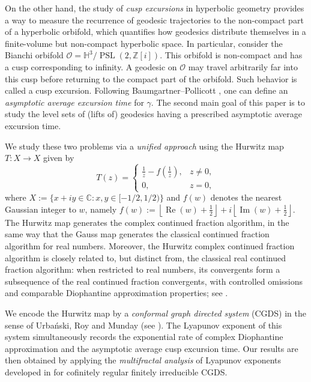 \documentclass[11pt]{amsart}
\theoremstyle{plain}
\theoremstyle{definition}
\renewcommand\~{\tilde}%
\numberwithin{equation}{section}
\begin{document}
On the other hand, the study of {\it cusp excursions} in hyperbolic geometry
provides a way to measure the recurrence of geodesic trajectories to the non-compact part of a hyperbolic orbifold, which quantifies how geodesics distribute themselves in a finite-volume but non-compact hyperbolic space. In particular, consider
the Bianchi orbifold $\mathcal O = \mathbb H^3/ \operatorname{PSL}(2,\mathbb Z[i])$. This orbifold is non-compact and has a cusp corresponding to infinity. A geodesic on $\mathcal O$ may travel arbitrarily far into this cusp before returning to the compact part of the orbifold. Such behavior is called a cusp excursion. Following Baumgartner--Pollicott \cite{baumgartnerP}, one can define an {\it asymptotic average excursion time} for $\gamma$. The second main goal of this paper is to study the level sets of (lifts of) geodesics having a prescribed asymptotic average excursion time.

We study these two problems via a {\it unified approach} using the Hurwitz map $T:X\to X$
given by
$$T(z) =
    \begin{cases}
    \displaystyle \frac{1}{z}
    -
    f\!\left(\frac{1}{z}\right),
    & z\neq 0, \\[1em]
    0, & z=0,
    \end{cases}
$$
where $X
    :=
    \{x+iy\in\mathbb C : x,y\in[-1/2,1/2)\}$ and $f(w)$ denotes the nearest Gaussian integer to $w$, namely
$f(w):=\left\lfloor \operatorname{Re}(w)+\frac12\right\rfloor
    +
    i\left\lfloor \operatorname{Im}(w)+\frac12\right\rfloor.
$
The Hurwitz map generates the complex continued fraction algorithm, in the same way that the Gauss map generates the classical continued fraction algorithm for real numbers. Moreover, the Hurwitz complex continued fraction algorithm is closely related to, but distinct from, the classical real continued fraction algorithm: when restricted to real numbers, its convergents form a subsequence of the real continued fraction convergents, with controlled omissions and comparable Diophantine approximation properties; see \cite[Theorem 2.1]{Sim17}.

We encode the Hurwitz map by a {\it conformal graph directed system} (CGDS) in the sense of Urba\'nski, Roy and Munday (see \cite[Definition 19.3.1]{Urbanski22}). The Lyapunov exponent of this system simultaneously records the exponential rate of complex Diophantine approximation and the asymptotic average cusp excursion time. 
Our results are then obtained by applying the {\it multifractal analysis} of Lyapunov exponents developed in \cite{NDDis} for cofinitely regular finitely irreducible CGDS. 
\end{document}
